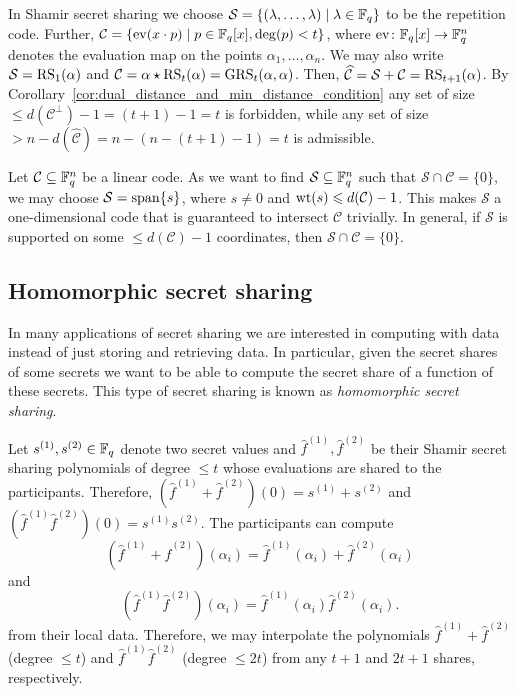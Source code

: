 \documentclass[../main.tex]{subfiles}
\begin{document}
\begin{example}
In Shamir secret sharing we choose $\mathcal{S} = \{(\lambda, \dots, \lambda) \mid \lambda \in \mathbb{F}_q \}$ to be the repetition code. Further, $\mathcal{C} = \{ \operatorname{ev}(x \cdot p) \mid p \in \mathbb{F}_q[x], \deg(p) < t \}$, where $\operatorname{ev} \colon \mathbb{F}_q[x] \to \mathbb{F}_q^n$ denotes the evaluation map on the points $\alpha_1, \dots, \alpha_n$. We may also write $\mathcal{S} = \operatorname{RS}_1(\alpha)$ and $\mathcal{C} = \alpha \star \operatorname{RS}_t(\alpha) = \operatorname{GRS}_t(\alpha, \alpha)$. Then, $\widehat{\mathcal{C}} = \mathcal{S} + \mathcal{C} = \operatorname{RS}_{t + 1}(\alpha)$. By Corollary~\ref{cor:dual_distance_and_min_distance_condition} any set of size $\leq d(\mathcal{C}^\perp) - 1 = (t + 1) - 1 = t$ is forbidden, while any set of size $> n - d(\hat{\mathcal{C}}) = n - (n - (t + 1) - 1) = t$ is admissible.
\end{example}

\begin{remark}\label{rmk:trivial_intersection_from_weight}
Let $\mathcal{C} \subseteq \mathbb{F}_q^n$ be a linear code. As we want to find $\mathcal{S} \subseteq \mathbb{F}_q^n$ such that $\mathcal{S} \cap \mathcal{C} = \{0\}$, we may choose $\mathcal{S} = \operatorname{span} \{s\}$, where $s \neq 0$ and $\operatorname{wt}(s) \leqslant d(\mathcal{C}) - 1$. This makes $\mathcal{S}$ a one-dimensional code that is guaranteed to intersect $\mathcal{C}$ trivially. In general, if $\mathcal{S}$ is supported on some $\leq d(\mathcal{C}) - 1$ coordinates, then $\mathcal{S} \cap \mathcal{C} = \{0\}$.
\end{remark}

\subsection{Homomorphic secret sharing}

In many applications of secret sharing we are interested in computing with data instead of just storing and retrieving data. In particular, given the secret shares of some secrets we want to be able to compute the secret share of a function of these secrets. This type of secret sharing is known as \emph{homomorphic secret sharing}.

\begin{example}
Let $s^{(1)}, s^{(2)} \in \mathbb{F}_q$ denote two secret values and $\hat{f}^{(1)}, \hat{f}^{(2)}$ be their Shamir secret sharing polynomials of degree $\leq t$ whose evaluations are shared to the participants. Therefore, $(\hat{f}^{(1)} + \hat{f}^{(2)})(0) = s^{(1)} + s^{(2)}$ and $(\hat{f}^{(1)} \hat{f}^{(2)})(0) = s^{(1)} s^{(2)}$. The participants can compute
\begin{equation*}
    (\hat{f}^{(1)} + \hat{f}^{(2)})(\alpha_i) = \hat{f}^{(1)}(\alpha_i) + \hat{f}^{(2)}(\alpha_i)
\end{equation*}
and
\begin{equation*}
    (\hat{f}^{(1)} \hat{f}^{(2)})(\alpha_i) = \hat{f}^{(1)}(\alpha_i) \hat{f}^{(2)}(\alpha_i).
\end{equation*}
from their local data. Therefore, we may interpolate the polynomials $\hat{f}^{(1)} + \hat{f}^{(2)}$ (degree $\leq t$) and $\hat{f}^{(1)}\hat{f}^{(2)}$ (degree $\leq 2t$) from any $t + 1$ and $2t + 1$ shares, respectively.
\end{example}
\end{document}
